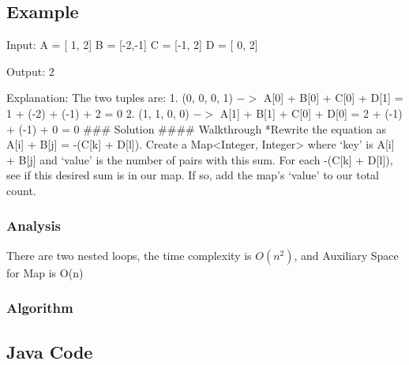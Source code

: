 \documentclass[]{book}
\begin{document}
\hypertarget{example-7}{%
\subsection{Example}\label{example-7}}

Input:
A = {[} 1, 2{]}
B = {[}-2,-1{]}
C = {[}-1, 2{]}
D = {[} 0, 2{]}

Output:
2

Explanation:
The two tuples are:
1. (0, 0, 0, 1) \(->\) A{[}0{]} + B{[}0{]} + C{[}0{]} + D{[}1{]} = 1 + (-2) + (-1) + 2 = 0
2. (1, 1, 0, 0) \(->\) A{[}1{]} + B{[}1{]} + C{[}0{]} + D{[}0{]} = 2 + (-1) + (-1) + 0 = 0
\#\#\# Solution
\#\#\#\# Walkthrough
*Rewrite the equation as A{[}i{]} + B{[}j{]} = -(C{[}k{]} + D{[}l{]}).
Create a Map\textless{}Integer, Integer\textgreater{} where `key' is A{[}i{]} + B{[}j{]} and `value' is the number of pairs with this sum.
For each -(C{[}k{]} + D{[}l{]}), see if this desired sum is in our map. If so, add the map's `value' to our total count.

\hypertarget{analysis-9}{%
\subsubsection{Analysis}\label{analysis-9}}

There are two nested loops, the time complexity is \(O(n^2)\), and Auxiliary Space for Map is O(n)

\hypertarget{algorithm-9}{%
\subsubsection{Algorithm}\label{algorithm-9}}

\hypertarget{java-code-7}{%
\subsection{Java Code}\label{java-code-7}}
\end{document}
